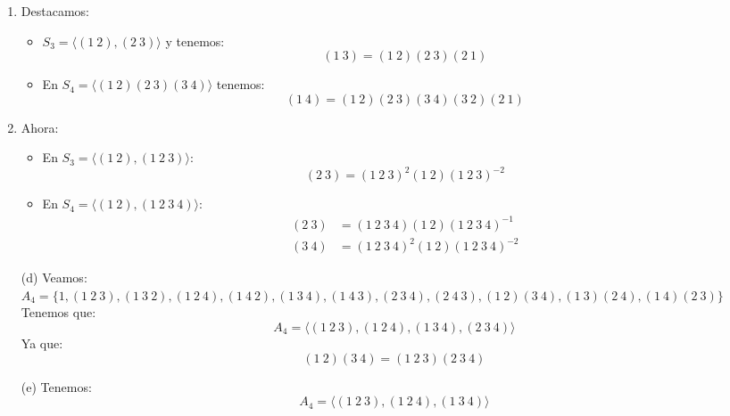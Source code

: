 \begin{ejemplo}
    \begin{enumerate}[label=(\alph*)]
        \item Destacamos:
        \begin{itemize}
            \item $S_3 = \langle (1\ 2), (2\ 3) \rangle $ y tenemos:
                \begin{equation*}
                    (1\ 3) = (1\ 2)(2\ 3)(2\ 1)
                \end{equation*}
            \item En $S_4 = \langle (1\ 2)(2\ 3)(3\ 4) \rangle $ tenemos:
                \begin{equation*}
                    (1\ 4) = (1\ 2)(2\ 3)(3\ 4)(3\ 2)(2\ 1)
                \end{equation*}
        \end{itemize}
        \item Ahora:
            \begin{itemize}
                \item En $S_3 = \langle (1\ 2), (1\ 2\ 3) \rangle $:
                    \begin{equation*}
                        (2\ 3) = {(1\ 2\ 3)}^{2}(1\ 2){(1\ 2\ 3)}^{-2}
                    \end{equation*}
                \item En $S_4 = \langle (1\ 2), (1\ 2\ 3\ 4) \rangle $:
                    \begin{align*}
                        (2\ 3) &= (1\ 2\ 3\ 4)(1\ 2){(1\ 2\ 3\ 4)}^{-1} \\
                        (3\ 4) &= {(1\ 2\ 3\ 4)}^{2}(1\ 2){(1\ 2\ 3\ 4)}^{-2}
                    \end{align*}
            \end{itemize}
        \item[(d)] Veamos:
             $A_4 = \{ 1, (1\ 2\ 3), (1\ 3\ 2), (1\ 2\ 4), (1\ 4\ 2), (1\ 3\ 4), (1\ 4\ 3), (2\ 3\ 4), (2\ 4\ 3), (1\ 2)(3\ 4), (1\ 3)(2\ 4), (1\ 4)(2\ 3) \} $
                Tenemos que:
                \begin{equation*}
                    A_4 = \langle (1\ 2\ 3), (1\ 2\ 4), (1\ 3\ 4), (2\ 3\ 4) \rangle 
                \end{equation*}
                Ya que:
                \begin{equation*}
                    (1\ 2)(3\ 4) = (1\ 2\ 3)(2\ 3\ 4)
                \end{equation*}
            \item[(e)] Tenemos:
                \begin{equation*}
                    A_4 = \langle (1\ 2\ 3), (1\ 2\ 4), (1\ 3\ 4) \rangle 
                \end{equation*}
    \end{enumerate}
\end{ejemplo}

